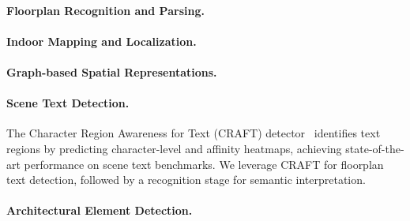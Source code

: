 \documentclass[manuscript,screen,review]{acmart}
\begin{document}
\paragraph{Floorplan Recognition and Parsing.}

\paragraph{Indoor Mapping and Localization.}

\paragraph{Graph-based Spatial Representations.}

\paragraph{Scene Text Detection.}
The Character Region Awareness for Text (CRAFT) detector~\cite{craft} identifies text regions by predicting character-level and affinity heatmaps, achieving state-of-the-art performance on scene text benchmarks. We leverage CRAFT for floorplan text detection, followed by a recognition stage for semantic interpretation.

\paragraph{Architectural Element Detection.}

\end{document}

